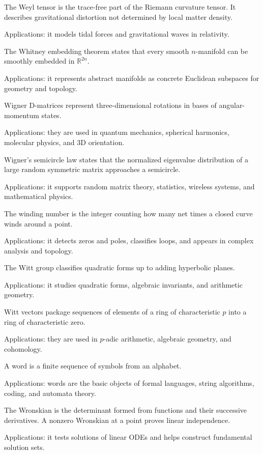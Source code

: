 The Weyl tensor is the trace-free part of the Riemann curvature tensor. It describes gravitational distortion not determined by local matter density. \par\noindent Applications: it models tidal forces and gravitational waves in relativity.

The Whitney embedding theorem states that every smooth $n$-manifold can be smoothly embedded in $\mathbb R^{2n}$. \par\noindent Applications: it represents abstract manifolds as concrete Euclidean subspaces for geometry and topology.

Wigner D-matrices represent three-dimensional rotations in bases of angular-momentum states. \par\noindent Applications: they are used in quantum mechanics, spherical harmonics, molecular physics, and 3D orientation.

Wigner's semicircle law states that the normalized eigenvalue distribution of a large random symmetric matrix approaches a semicircle. \par\noindent Applications: it supports random matrix theory, statistics, wireless systems, and mathematical physics.

The winding number is the integer counting how many net times a closed curve winds around a point. \par\noindent Applications: it detects zeros and poles, classifies loops, and appears in complex analysis and topology.

The Witt group classifies quadratic forms up to adding hyperbolic planes. \par\noindent Applications: it studies quadratic forms, algebraic invariants, and arithmetic geometry.

Witt vectors package sequences of elements of a ring of characteristic $p$ into a ring of characteristic zero. \par\noindent Applications: they are used in $p$-adic arithmetic, algebraic geometry, and cohomology.

A word is a finite sequence of symbols from an alphabet. \par\noindent Applications: words are the basic objects of formal languages, string algorithms, coding, and automata theory.

The Wronskian is the determinant formed from functions and their successive derivatives. A nonzero Wronskian at a point proves linear independence. \par\noindent Applications: it tests solutions of linear ODEs and helps construct fundamental solution sets.
